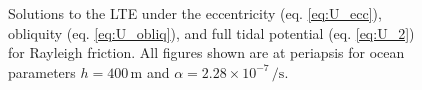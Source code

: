 \begin{figure}[!t]
\begin{subfigure}{\linewidth}
\subcaption{\label{fig:LTE_c}}
\end{subfigure}\vspace*{-0.8cm}
\caption{Solutions to the LTE under the eccentricity (eq. \ref{eq:U_ecc}), obliquity (eq. \ref{eq:U_obliq}), and full tidal potential (eq. \ref{eq:U_2}) for Rayleigh friction. All figures shown are at periapsis for ocean parameters $h = 400 \, \si{\metre}$ and $\alpha = 2.28 \times 10^{-7} \, \si{\per\second}$. \label{fig:LTE_solns}}
\end{figure}


